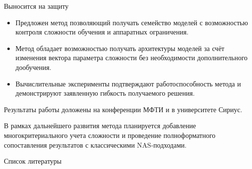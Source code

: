 \documentclass{beamer}
\begin{document}

\begin{frame}{Выносится на защиту}
\begin{itemize}
    \item Предложен метод позволяющий получать семейство моделей с возможностью контроля сложности обучения и аппаратных ограничения.
    \item Метод обладает возможностью получать архитектуры моделей за счёт изменения вектора параметра сложности без необходимости дополнительного дообучения.
    \item Вычислительные эксперименты подтверждают работоспособность метода и демонстрируют заявленную гибкость получаемого решения.
\end{itemize}

\vspace{10pt}
Результаты работы доложены на конференции МФТИ и в университете Сириус.

В рамках дальнейшего развития метода планируется добавление многокритериального учета сложности и проведение полноформатного сопоставления результатов с классическими NAS-подходами.

\end{frame}



\begin{frame}{Список литературы}
  \tiny
  \nocite{*}                 %
  \printbibliography
\end{frame}

\end{document}
